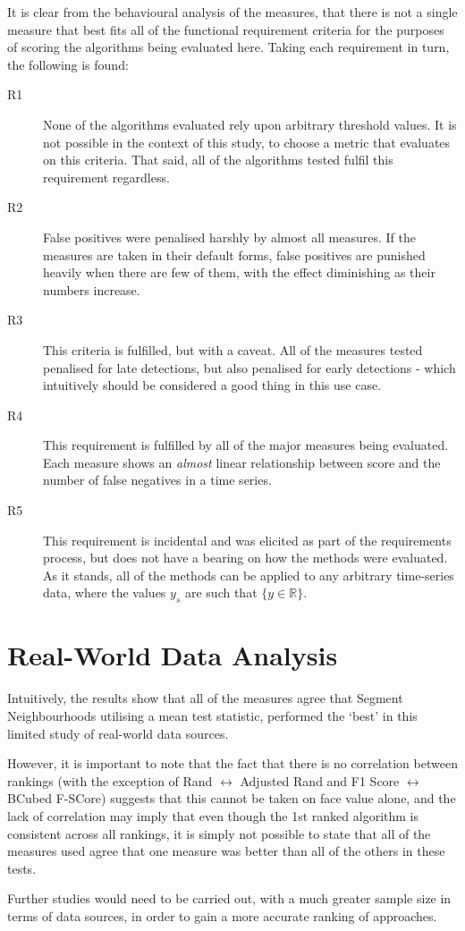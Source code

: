 \documentclass[../main.tex]{subfiles}
\begin{document}
It is clear from the behavioural analysis of the measures, that there is not a single measure that best fits all of the functional requirement criteria for the purposes of scoring the algorithms being evaluated here. Taking each requirement in turn, the following is found:

\begin{description}
    \item[R1] None of the algorithms evaluated rely upon arbitrary threshold values. It is not possible in the context of this study, to choose a metric that evaluates on this criteria. That said, all of the algorithms tested fulfil this requirement regardless.
    \item[R2] False positives were penalised harshly by almost all measures. If the measures are taken in their default forms, false positives are punished heavily when there are few of them, with the effect diminishing as their numbers increase.
    \item[R3] This criteria is fulfilled, but with a caveat. All of the measures tested penalised for late detections, but also penalised for early detections - which intuitively should be considered a good thing in this use case.
    \item[R4] This requirement is fulfilled by all of the major measures being evaluated. Each measure shows an \emph{almost} linear relationship between score and the number of false negatives in a time series.
    \item[R5] This requirement is incidental and was elicited as part of the requirements process, but does not have a bearing on how the methods were evaluated. As it stands, all of the methods can be applied to any arbitrary time-series data, where the values $y_s$ are such that $\{y \in \mathbb{R} \}$.
    \end{description}

\section{Real-World Data Analysis}

Intuitively, the results show that all of the measures agree that Segment Neighbourhoods utilising a mean test statistic, performed the `best' in this limited study of real-world data sources.

However, it is important to note that the fact that there is no correlation between rankings (with the exception of Rand $\leftrightarrow$ Adjusted Rand and F1 Score $\leftrightarrow$ BCubed F-SCore) suggests that this cannot be taken on face value alone, and the lack of correlation may imply that even though the 1st ranked algorithm is consistent across all rankings, it is simply not possible to state that all of the measures used agree that one measure was better than all of the others in these tests.

Further studies would need to be carried out, with a much greater sample size in terms of data sources, in order to gain a more accurate ranking of approaches.
\end{document}
